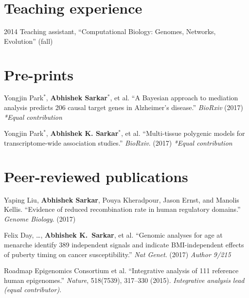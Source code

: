 \documentclass{article}
\begin{document}
\section*{Teaching experience}
\begin{hdesc}[itemsep=1em]
\item[2014] Teaching assistant, ``Computational Biology: Genomes, Networks, Evolution'' (fall)
\end{hdesc}

\section*{Pre-prints}
\begin{henum}
\item Yongjin Park$^*$, \textbf{Abhishek Sarkar$^*$}, et al. ``A Bayesian
  approach to mediation analysis predicts 206 causal target genes in
  Alzheimer's disease.'' \emph{BioRxiv} (2017) \emph{*Equal
  contribution}
\item Yongjin Park$^*$, \textbf{Abhishek K. Sarkar}$^*$, et al. ``Multi-tissue
  polygenic models for transcriptome-wide association studies.''
  \emph{BioRxiv}. (2017) \emph{*Equal contribution}
\end{henum}

\section*{Peer-reviewed publications}
\begin{henum}
\item Yaping Liu, \textbf{Abhishek Sarkar}, Pouya Kheradpour, Jason Ernst, and
  Manolis Kellis. ``Evidence of reduced recombination rate in human regulatory
  domains.'' \emph{Genome Biology}. (2017)
\item Felix Day, \ldots, \textbf{Abhishek K.\ Sarkar}, et al. ``Genomic
  analyses for age at menarche identify 389 independent signals and indicate
  BMI-independent effects of puberty timing on cancer susceptibility.''
  \emph{Nat Genet}. (2017) \emph{Author 9/215}
\item Roadmap Epigenomics Consortium et al. ``Integrative analysis of 111
  reference human epigenomes.'' \emph{Nature}, 518(7539), 317–330 (2015).
  \emph{Integrative analysis lead (equal contributor)}.
\end{henum}
\end{document}
